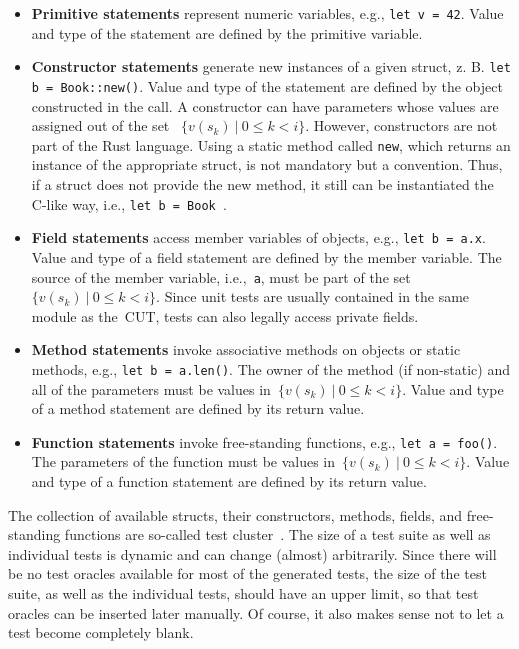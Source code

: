 \documentclass[paper=a4,%
  twoside,%
  BCOR4mm,%
  abstract=true,%
  toc=bibliography,%
  chapterprefix=true,%
  toc=bibliographynumbered,%
  open=right,%
  english,%
  pagesize=pdftex]{scrreprt}
\begin{document}
\begin{itemize}
    \item \textbf{Primitive statements} represent numeric variables, e.g., \texttt{let v = 42}. Value and type of the statement are defined by the primitive variable.
    \item \textbf{Constructor statements} generate new instances of a given struct, z. B. \texttt{let b = Book::new()}. Value and type of the statement are defined by the object constructed in the call. A constructor can have parameters whose values are assigned out of the set ~$\{v(s_k)~|~0 \leq k < i\}$. However, constructors are not part of the Rust language. Using a static method called \texttt{new}, which returns an instance of the appropriate struct, is not mandatory but a convention. Thus, if a struct does not provide the new method, it still can be instantiated the C-like way, i.e., \texttt{let b = Book }.
    \item \textbf{Field statements} access member variables of objects, e.g., \texttt{let b = a.x}. Value and type of a field statement are defined by the member variable. The source of the member variable, i.e.,~\texttt{a}, must be part of the set~$\{v(s_k)~|~0 \leq k < i\}$. Since unit tests are usually contained in the same module as the~\ac{CUT}, tests can also legally access private fields.
    \item \textbf{Method statements} invoke associative methods on objects or static methods, e.g., \texttt{let b = a.len()}. The owner of the method (if non-static) and all of the parameters must be values in~${\{v(s_k)~|~0 \leq k < i\}}$. Value and type of a method statement are defined by its return value.
    \item \textbf{Function statements} invoke free-standing functions, e.g., \texttt{let a = foo()}. The parameters of the function must be values in~$\{v(s_k)~|~0 \leq k < i\}$. Value and type of a function statement are defined by its return value.
\end{itemize}

The collection of available structs, their constructors, methods, fields, and free-standing functions are so-called test cluster~\cite{Fraser_2011a}. The size of a test suite as well as individual tests is dynamic and can change (almost) arbitrarily. Since there will be no test oracles available for most of the generated tests, the size of the test suite, as well as the individual tests, should have an upper limit, so that test oracles can be inserted later manually. Of course, it also makes sense not to let a test become completely blank.
\end{document}
